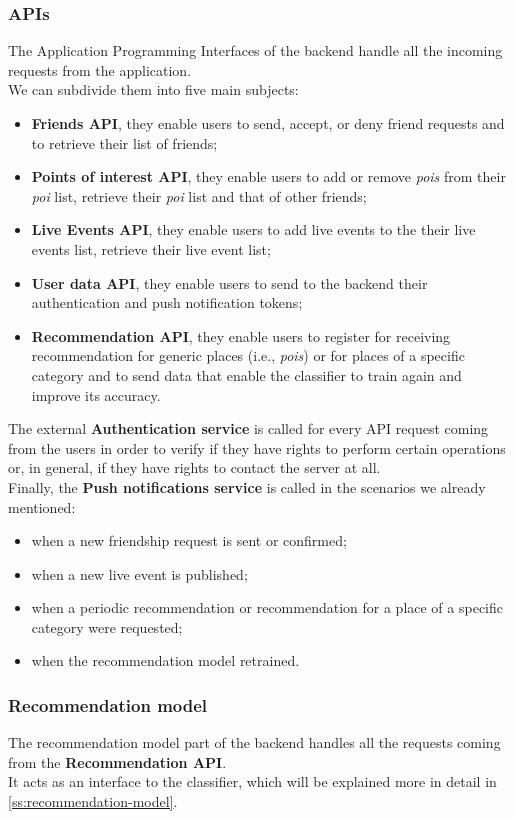 \documentclass[../../main]{subfiles}
\begin{document}
\subsubsection{APIs}
The Application Programming Interfaces of the backend handle all the incoming requests from the application.\\
We can subdivide them into five main subjects:
\begin{itemize}
    \item \textbf{Friends API}, they enable users to send, accept, or deny friend requests and to retrieve their list of friends;
    \item \textbf{Points of interest API}, they enable users to add or remove \textit{pois} from their \textit{poi} list, retrieve their \textit{poi} list and that of other friends;
    \item \textbf{Live Events API}, they enable users to add live events to the their live events list, retrieve their live event list;
    \item \textbf{User data API}, they enable users to send to the backend their authentication and push notification tokens;
    \item \textbf{Recommendation API}, they enable users to register for receiving recommendation for generic places (i.e., \textit{pois}) or for places of a specific category and to send data that enable the classifier to train again and improve its accuracy.
\end{itemize}
The external \textbf{Authentication service} is called for every API request coming from the users in order to verify if they have rights to perform certain operations or, in general, if they have rights to contact the server at all.\\
Finally, the \textbf{Push notifications service} is called in the scenarios we already mentioned:
\begin{itemize}
    \item when a new friendship request is sent or confirmed;
    \item when a new live event is published;
    \item when a periodic recommendation or recommendation for a place of a specific category were requested;
    \item when the recommendation model retrained.
\end{itemize}

\label{sss:recommendation-model-design}
\subsubsection{Recommendation model}
The recommendation model part of the backend handles all the requests coming from the \textbf{Recommendation API}.\\
It acts as an interface to the classifier, which will be explained more in detail in \ref{ss:recommendation-model}.
\end{document}
